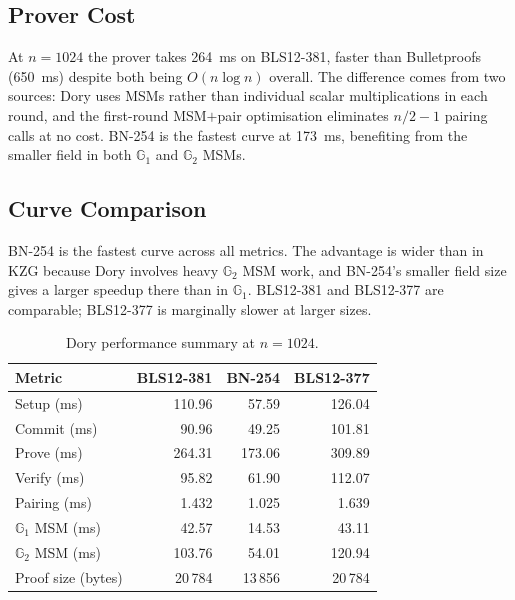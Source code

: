 \subsection{Prover Cost}

At $n = 1024$ the prover takes 264~ms on BLS12-381, faster than Bulletproofs
(650~ms) despite both being $O(n\log n)$ overall. The difference comes from
two sources: Dory uses MSMs rather than individual scalar multiplications in
each round, and the first-round MSM$+$pair optimisation eliminates $n/2 - 1$
pairing calls at no cost. BN-254 is the fastest curve at 173~ms, benefiting
from the smaller field in both $\mathbb{G}_1$ and $\mathbb{G}_2$ MSMs.

\subsection{Curve Comparison}

BN-254 is the fastest curve across all metrics. The advantage is wider than in
KZG because Dory involves heavy $\mathbb{G}_2$ MSM work, and BN-254's smaller
field size gives a larger speedup there than in $\mathbb{G}_1$. BLS12-381 and
BLS12-377 are comparable; BLS12-377 is marginally slower at larger sizes.

\begin{table}[H]
\centering
\caption{Dory performance summary at $n = 1024$.}
\label{tab:dory-summary}
\begin{tabular}{lrrr}
\toprule
\textbf{Metric} & \textbf{BLS12-381} & \textbf{BN-254} & \textbf{BLS12-377} \\
\midrule
Setup (ms)                          & 110.96 & 57.59  & 126.04  \\
Commit (ms)                         & 90.96  & 49.25  & 101.81  \\
Prove (ms)                          & 264.31 & 173.06 & 309.89  \\
Verify (ms)                         & 95.82  & 61.90  & 112.07  \\
Pairing (ms)                        & 1.432  & 1.025  & 1.639   \\
$\mathbb{G}_1$ MSM (ms)            & 42.57  & 14.53  & 43.11   \\
$\mathbb{G}_2$ MSM (ms)            & 103.76 & 54.01  & 120.94  \\
Proof size (bytes)                  & 20\,784 & 13\,856 & 20\,784 \\
\bottomrule
\end{tabular}
\end{table}
